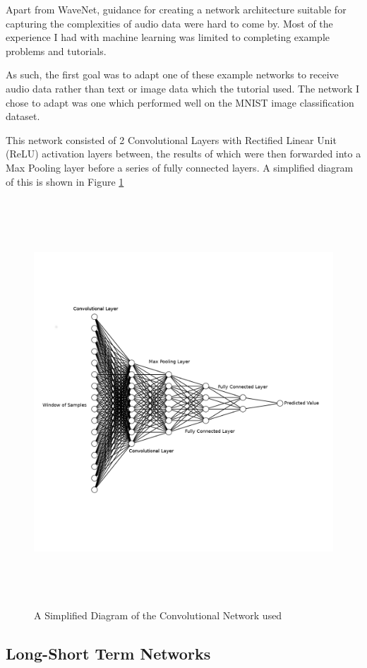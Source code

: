 \documentclass{l4proj}
\begin{document}
Apart from WaveNet, guidance for creating a network architecture
suitable for capturing the complexities of audio data were hard to come
by. Most of the experience I had with machine learning was limited to
completing example problems and tutorials.

As such, the first goal was to adapt one of these example networks to
receive audio data rather than text or image data which the tutorial
used. The network I chose to adapt was one which performed well on the
MNIST image classification dataset.

This network consisted of 2 Convolutional Layers with Rectified Linear
Unit (ReLU) activation layers between, the results of which were then
forwarded into a Max Pooling layer before a series of fully connected
layers. A simplified diagram of this is shown in Figure \ref{fig:nn}

\begin{figure}
\centering
\includegraphics[width=\textwidth,height=6in]{images/cnn.png}
\caption{A Simplified Diagram of the Convolutional Network
used\label{fig:nn}}
\end{figure}

\hypertarget{long-short-term-networks}{%
\subsection{Long-Short Term Networks}\label{long-short-term-networks}}
\end{document}
